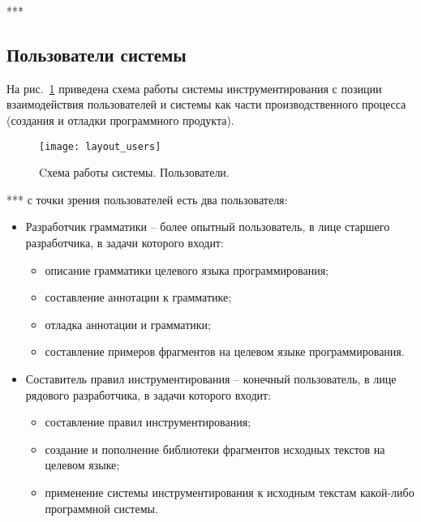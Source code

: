 ***

\subsection{Пользователи системы}

На рис.~\ref{fig:layout_users} приведена схема работы системы инструментирования с позиции взаимодействия пользователей и системы как части производственного процесса (создания и отладки программного продукта).

\begin{figure}[h]
	\centering
	\texttt{[image: layout\_users]}
	\caption{Cхема работы системы. Пользователи.}
	\label{fig:layout_users}
\end{figure}

***
с точки зрения пользователей есть два пользователя:

\begin{itemize}[noitemsep]
  \item Разработчик грамматики -- более опытный пользователь, в лице старшего разработчика, в задачи которого входит:
    \begin{itemize}[noitemsep]
      \item описание грамматики целевого языка программирования;
      \item составление аннотации к грамматике;
      \item отладка аннотации и грамматики;
      \item составление примеров фрагментов на целевом языке программирования.
    \end{itemize}

  \item Составитель правил инструментирования -- конечный пользователь, в лице рядового разработчика, в задачи которого входит:
    \begin{itemize}[noitemsep]
      \item составление правил инструментирования;
      \item создание и пополнение библиотеки фрагментов исходных текстов на целевом языке;
      \item применение системы инструментирования к исходным текстам какой-либо программной системы.
    \end{itemize}
\end{itemize}

